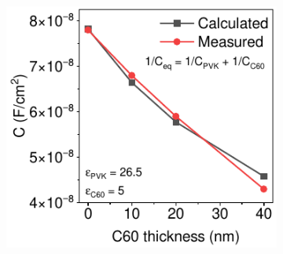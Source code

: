 \begin{figure}[t]
\begin{subfigure}[t]{0.48\textwidth}
        \caption{}
        \label{}
    \end{subfigure}
    \hfill
    \begin{subfigure}[t]{0.45\textwidth}
        \centering
        \includegraphics[width=\textwidth]{chapters/transport_layers/images/C_f_c60_thick.pdf} %
        \caption{}
        \label{}
    \end{subfigure}
    \caption{}
    \label{}
\end{figure}


